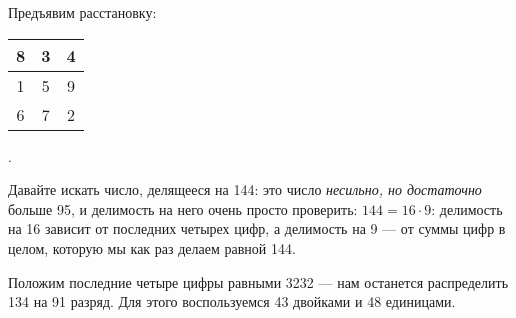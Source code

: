 ﻿
\begin{itemize}
\itA Предъявим расстановку:

\begin{center}
\begin{tabular}{|c|c|c|}
\hline
	8 & 3 & 4 \\
\hline
	1 & 5 & 9 \\
\hline
	6 & 7 & 2 \\
\hline
\end{tabular}
\end{center}

.

\itC Давайте искать число, делящееся на 144: это число {\itshape несильно, но достаточно} больше 95, и делимость на него очень просто проверить: $144 = 16\cdot 9$: делимость на 16 зависит от последних четырех цифр, а делимость на 9 — от суммы цифр в целом, которую мы как раз делаем равной 144.

Положим последние четыре цифры равными 3232 — нам останется распределить 134 на 91 разряд. Для этого воспользуемся 43 двойками и 48 единицами.
\end{itemize}
